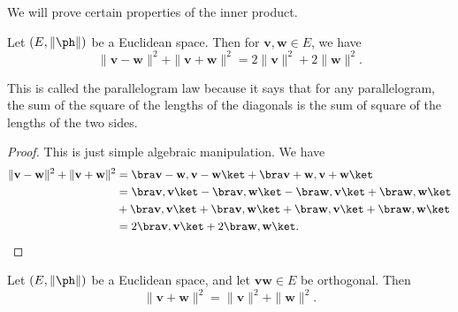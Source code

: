 \documentclass[a4paper]{article}
\begin{document}
We will prove certain properties of the inner product.
\begin{prop}
  Let $(E, \|\ph\|)$ be a Euclidean space. Then for $\mathbf{v}, \mathbf{w} \in E$, we have
  \[
    \|\mathbf{v} - \mathbf{w}\|^2 + \|\mathbf{v} + \mathbf{w}\|^2 = 2\|\mathbf{v}\|^2 + 2\|\mathbf{w}\|^2.
  \]
\end{prop}
This is called the parallelogram law because it says that for any parallelogram, the sum of the square of the lengths of the diagonals is the sum of square of the lengths of the two sides.
\begin{center}
\end{center}

\begin{proof}
  This is just simple algebraic manipulation. We have
  \begin{align*}
    \|\mathbf{v} - \mathbf{w}\|^2 + \|\mathbf{v} + \mathbf{w}\|^2 &= \bra \mathbf{v} - \mathbf{w}, \mathbf{v} - \mathbf{w}\ket + \bra \mathbf{v} + \mathbf{w}, \mathbf{v} + \mathbf{w}\ket\\
    &= \bra \mathbf{v}, \mathbf{v}\ket - \bra \mathbf{v}, \mathbf{w}\ket - \bra \mathbf{w}, \mathbf{v}\ket + \bra \mathbf{w}, \mathbf{w}\ket\\
    &+ \bra \mathbf{v}, \mathbf{v}\ket + \bra \mathbf{v}, \mathbf{w}\ket + \bra \mathbf{w}, \mathbf{v}\ket + \bra \mathbf{w}, \mathbf{w}\ket\\
    &= 2\bra \mathbf{v}, \mathbf{v}\ket + 2 \bra \mathbf{w}, \mathbf{w}\ket.
  \end{align*}
\end{proof}

\begin{prop}
  Let $(E, \|\ph\|)$ be a Euclidean space, and let $\mathbf{v} \mathbf{w}\in E$ be orthogonal. Then
  \[
    \|\mathbf{v} + \mathbf{w}\|^2 = \|\mathbf{v}\|^2 + \|\mathbf{w}\|^2.
  \]
\end{prop}
\end{document}
